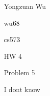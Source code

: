\documentclass[a4paper,12pt]{article}
\begin{document}
Yongzuan Wu

wu68

cs573

HW 4

Problem 5

I dont know
\end{document}

